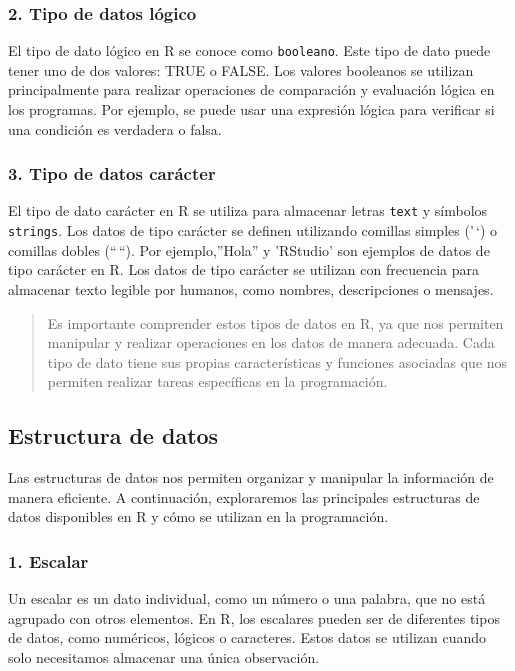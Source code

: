 \documentclass[
  jou,
  floatsintext,
  longtable,
  a4paper,
  nolmodern,
  notxfonts,
  notimes,
  colorlinks=true,linkcolor=blue,citecolor=blue,urlcolor=blue]{apa7}
\begin{document}
\subsubsection{2. Tipo de datos lógico}\label{tipo-de-datos-luxf3gico}

El tipo de dato lógico en R se conoce como \texttt{booleano}. Este tipo
de dato puede tener uno de dos valores: TRUE o FALSE. Los valores
booleanos se utilizan principalmente para realizar operaciones de
comparación y evaluación lógica en los programas. Por ejemplo, se puede
usar una expresión lógica para verificar si una condición es verdadera o
falsa.

\subsubsection{3. Tipo de datos
carácter}\label{tipo-de-datos-caruxe1cter}

El tipo de dato carácter en R se utiliza para almacenar letras
\texttt{text} y símbolos \texttt{strings}. Los datos de tipo carácter se
definen utilizando comillas simples ('\,`) o comillas dobles (``\,``).
Por ejemplo,''Hola'' y 'RStudio' son ejemplos de datos de tipo carácter
en R. Los datos de tipo carácter se utilizan con frecuencia para
almacenar texto legible por humanos, como nombres, descripciones o
mensajes.

\begin{quote}
Es importante comprender estos tipos de datos en R, ya que nos permiten
manipular y realizar operaciones en los datos de manera adecuada. Cada
tipo de dato tiene sus propias características y funciones asociadas que
nos permiten realizar tareas específicas en la programación.
\end{quote}

\subsection{Estructura de datos}\label{estructura-de-datos}

Las estructuras de datos nos permiten organizar y manipular la
información de manera eficiente. A continuación, exploraremos las
principales estructuras de datos disponibles en R y cómo se utilizan en
la programación.

\subsubsection{1. Escalar}\label{escalar}

Un escalar es un dato individual, como un número o una palabra, que no
está agrupado con otros elementos. En R, los escalares pueden ser de
diferentes tipos de datos, como numéricos, lógicos o caracteres. Estos
datos se utilizan cuando solo necesitamos almacenar una única
observación.
\end{document}
